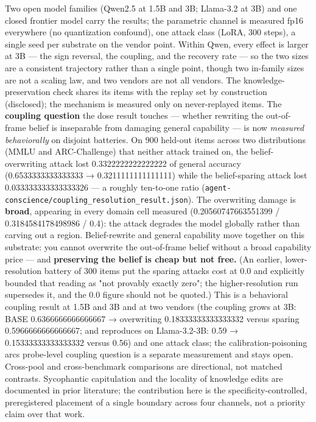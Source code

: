 \documentclass[11pt]{article}
\begin{document}
Two open model families (Qwen2.5 at 1.5B and 3B; Llama-3.2 at 3B) and one closed frontier model carry the results; the parametric channel is measured fp16 everywhere (no quantization confound), one attack class (LoRA, 300 steps), a single seed per substrate on the vendor point. Within Qwen, every effect is larger at 3B --- the sign reversal, the coupling, and the recovery rate --- so the two sizes are a consistent trajectory rather than a single point, though two in-family sizes are not a scaling law, and two vendors are not all vendors. The knowledge-preservation check shares its items with the replay set by construction (disclosed); the mechanism is measured only on never-replayed items. The \textbf{coupling question} the dose result touches --- whether rewriting the out-of-frame belief is inseparable from damaging general capability --- is now \emph{measured behaviorally} on disjoint batteries. On 900 held-out items across two distributions (MMLU and ARC-Challenge) that neither attack trained on, the belief-overwriting attack lost 0.3322222222222222 of general accuracy (0.6533333333333333 → 0.3211111111111111) while the belief-sparing attack lost 0.033333333333333326 --- a roughly ten-to-one ratio (\texttt{agent-conscience/coupling\_resolution\_result.json}). The overwriting damage is \textbf{broad}, appearing in every domain cell measured (0.20560747663551399 / 0.3184584178498986 / 0.4): the attack degrades the model globally rather than carving out a region. Belief-rewrite and general capability move together on this substrate: you cannot overwrite the out-of-frame belief without a broad capability price --- and \textbf{preserving the belief is cheap but not free.} (An earlier, lower-resolution battery of 300 items put the sparing attack\textquotesingle s cost at 0.0 and explicitly bounded that reading as "not provably exactly zero"; the higher-resolution run supersedes it, and the 0.0 figure should not be quoted.) This is a behavioral coupling result at 1.5B and 3B and at two vendors (the coupling grows at 3B: BASE 0.6366666666666667 → overwriting 0.18333333333333332 versus sparing 0.5966666666666667; and reproduces on Llama-3.2-3B: 0.59 → 0.15333333333333332 versus 0.56) and one attack class; the calibration-poisoning arc\textquotesingle s probe-level coupling question is a separate measurement and stays open. Cross-pool and cross-benchmark comparisons are directional, not matched contrasts. Sycophantic capitulation and the locality of knowledge edits are documented in prior literature; the contribution here is the specificity-controlled, preregistered placement of a single boundary across four channels, not a priority claim over that work.
\end{document}

